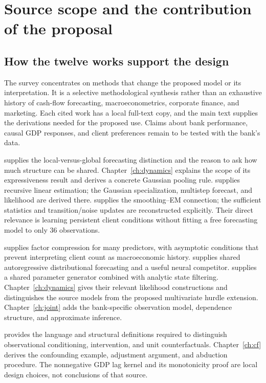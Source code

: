 \chapter{Source scope and the contribution of the proposal}
\label{ch:sources}
\section{How the twelve works support the design}
The survey concentrates on methods that change the proposed model or its interpretation. It is a selective methodological synthesis rather than an exhaustive history of cash-flow forecasting, macroeconometrics, corporate finance, and marketing. Each cited work has a local full-text copy, and the main text supplies the derivations needed for the proposed use. Claims about bank performance, causal GDP responses, and client preferences remain to be tested with the bank's data.

\citet{montero2021global} supplies the local-versus-global forecasting distinction and the reason to ask how much structure can be shared. Chapter~\ref{ch:dynamics} explains the scope of its expressiveness result and derives a concrete Gaussian pooling rule. \citet{kalman1960} supplies recursive linear estimation; the Gaussian specialization, multistep forecast, and likelihood are derived there. \citet{shumway1982} supplies the smoothing--EM connection; the sufficient statistics and transition/noise updates are reconstructed explicitly. Their direct relevance is learning persistent client conditions without fitting a free forecasting model to only 36 observations.

\citet{stock2002} supplies factor compression for many predictors, with asymptotic conditions that prevent interpreting client count as macroeconomic history. \citet{salinas2020deepar} supplies shared autoregressive distributional forecasting and a useful neural competitor. \citet{rangapuram2018} supplies a shared parameter generator combined with analytic state filtering. Chapter~\ref{ch:dynamics} gives their relevant likelihood constructions and distinguishes the source models from the proposed multivariate hurdle extension. Chapter~\ref{ch:joint} adds the bank-specific observation model, dependence structure, and approximate inference.

\citet{pearl2009} provides the language and structural definitions required to distinguish observational conditioning, intervention, and unit counterfactuals. Chapter~\ref{ch:cf} derives the confounding example, adjustment argument, and abduction procedure. The nonnegative GDP lag kernel and its monotonicity proof are local design choices, not conclusions of that source.


